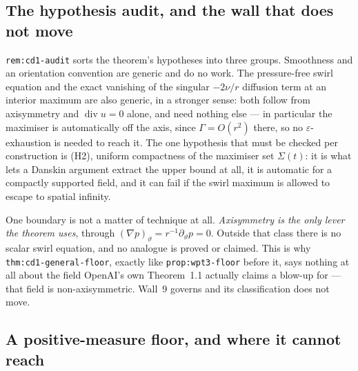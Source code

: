 \subsection{The hypothesis audit, and the wall that does not move}
\label{sec:ff-s60-audit}

\texttt{rem:cd1-audit} sorts the theorem's hypotheses into three groups.
Smoothness and an orientation convention are generic and do no work. The
pressure-free swirl equation and the exact vanishing of the singular
\(-2\nu/r\) diffusion term at an interior maximum are also generic, in a
stronger sense: both follow from axisymmetry and \(\operatorname{div}u=0\)
alone, and need nothing else --- in particular the maximiser is automatically
off the axis, since \(\Gamma=O(r^2)\) there, so no \(\varepsilon\)-exhaustion
is needed to reach it. The one hypothesis that must be checked per
construction is (H2), uniform compactness of the maximiser set \(\Sigma(t)\):
it is what lets a Danskin argument extract the upper bound at all, it is
automatic for a compactly supported field, and it can fail if the swirl
maximum is allowed to escape to spatial infinity.

One boundary is not a matter of technique at all. \emph{Axisymmetry is the
only lever the theorem uses}, through \((\nabla p)_\vartheta=
r^{-1}\partial_\vartheta p=0\). Outside that class there is no scalar swirl
equation, and no analogue is proved or claimed. This is why
\texttt{thm:cd1-general-floor}, exactly like \texttt{prop:wpt3-floor} before
it, says nothing at all about the field OpenAI's own Theorem~1.1 actually
claims a blow-up for --- that field is non-axisymmetric. Wall~9 governs and
its classification does not move.

\subsection{A positive-measure floor, and where it cannot reach}
\label{sec:ff-s60-lq}

